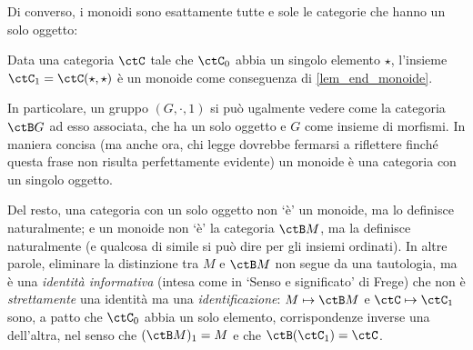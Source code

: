 Di converso, i monoidi sono esattamente tutte e sole le categorie che hanno un solo oggetto:
\begin{theorem}\label{cat_sonomon}
	Data una categoria \(\ctC\) tale che \(\ctC_0\) abbia un singolo elemento \(\star\), l'insieme \(\ctC_1 = \Hom{\ctC}(\star,\star)\) è un monoide come conseguenza di \ref{lem_end_monoide}.
\end{theorem}
%
%
\begin{corollary}\label{cor_cat_mon}
	In particolare, un gruppo \((G,\cdot,1)\) si può ugalmente vedere come la categoria \(\ctB G\) ad esso associata, che ha un solo oggetto e \(G\) come insieme di morfismi. In maniera concisa (ma anche ora, chi legge dovrebbe fermarsi a riflettere finché questa frase non risulta perfettamente evidente) un monoide è una categoria con un singolo oggetto.%
\end{corollary}
\begin{remark}
	Del resto, una categoria con un solo oggetto non `è' un monoide, ma lo definisce naturalmente; e un monoide non `è' la categoria \(\ctB M\), ma la definisce naturalmente (e qualcosa di simile si può dire per gli insiemi ordinati). In altre parole, eliminare la distinzione tra \(M\) e \(\ctB M\) non segue da una tautologia, ma è una \emph{identità informativa} (intesa come in `Senso e significato' di Frege) che non è \emph{strettamente} una identità ma una \emph{identificazione}: \(M\mapsto \ctB M\) e \(\ctC\mapsto \ctC_1\) sono, a patto che \(\ctC_0\) abbia un solo elemento, corrispondenze inverse una dell'altra, nel senso che \((\ctB M)_1 = M\) e che \(\ctB(\ctC_1) = \ctC\).
\end{remark}
